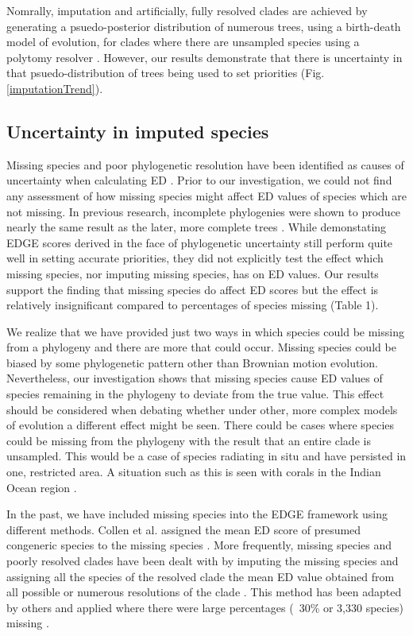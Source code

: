 \documentclass[12pt,english]{article}
\begin{document}
Nomrally, imputation and artificially, fully resolved clades are achieved by
generating a psuedo-posterior distribution of numerous trees, using a
birth-death model of evolution, for clades where there are unsampled species
using a polytomy resolver \autocite{Kuhn2011}. However, our results demonstrate
that there is uncertainty in that psuedo-distribution of trees being used to set
priorities (Fig. \ref{imputationTrend}).

\subsection*{Uncertainty in imputed species}
Missing species and poor phylogenetic resolution have been identified as causes
of uncertainty when calculating ED \autocite{Isaac2007}. Prior to our
investigation, we could not find any assessment of how missing species might
affect ED values of species which are not missing. In previous research,
incomplete phylogenies were shown to produce nearly the same result as the
later, more complete trees \autocite{Curnick2015}. While demonstating EDGE
scores derived in the face of phylogenetic uncertainty still perform quite well
in setting accurate priorities, they did not explicitly test the effect which
missing species, nor imputing missing species, has on ED values. Our results
support the finding that missing species do affect ED scores but the effect is
relatively insignificant compared to percentages of species missing (Table 1). 

We realize that we have provided just two ways in which species could be missing
from a phylogeny and there are more that could occur. Missing species could be
biased by some phylogenetic pattern other than Brownian motion evolution.
Nevertheless, our investigation shows that missing species cause ED values of
species remaining in the phylogeny to deviate from the true value. This effect
should be considered when debating whether under other, more complex models of
evolution a different effect might be seen. There could be cases where species
could be missing from the phylogeny with the result that an entire clade is
unsampled. This would be a case of species radiating in situ and have persisted
in one, restricted area. A situation such as this is seen with corals in the
Indian Ocean region \autocite{Arrigoni2012}.

In the past, we have included missing species into the EDGE framework using
different methods. Collen et al. assigned the mean ED score of presumed
congeneric species to the missing species \citeyear{Collen2011}. More
frequently, missing species and poorly resolved clades have been dealt with by
imputing the missing species and assigning all the species of the resolved clade
the mean ED value obtained from all possible or numerous resolutions of the
clade \autocite{Isaac2007; Isaac2012}. This method has been adapted by others
and applied where there were large percentages (~30\% or 3,330 species) missing
\autocite{Jetz2014}. 
\end{document}
